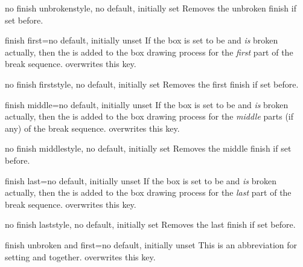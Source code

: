 \begin{docTcbKey}{no finish unbroken}{}{style, no default, initially set}
  Removes the unbroken finish if set before.
\end{docTcbKey}

\begin{docTcbKey}{finish first}{=}{no default, initially unset}
  If the box is set to be  and \emph{is} broken actually,
  then the  is added to the box drawing process for
  the \emph{first} part of the break sequence.
   overwrites this key.
\end{docTcbKey}

\begin{docTcbKey}{no finish first}{}{style, no default, initially set}
  Removes the first finish if set before.
\end{docTcbKey}

\begin{docTcbKey}{finish middle}{=}{no default, initially unset}
  If the box is set to be  and \emph{is} broken actually,
  then the  is added to the box drawing process for
  the \emph{middle} parts (if any) of the break sequence.
   overwrites this key.
\end{docTcbKey}

\begin{docTcbKey}{no finish middle}{}{style, no default, initially set}
  Removes the middle finish if set before.
\end{docTcbKey}

\begin{docTcbKey}{finish last}{=}{no default, initially unset}
  If the box is set to be  and \emph{is} broken actually,
  then the  is added to the box drawing process for
  the \emph{last} part of the break sequence.
   overwrites this key.
\end{docTcbKey}

\begin{docTcbKey}{no finish last}{}{style, no default, initially set}
  Removes the last finish if set before.
\end{docTcbKey}

\begin{docTcbKey}{finish unbroken and first}{=}{no default, initially unset}
  This is an abbreviation for setting
   and
   together.
   overwrites this key.
\end{docTcbKey}

